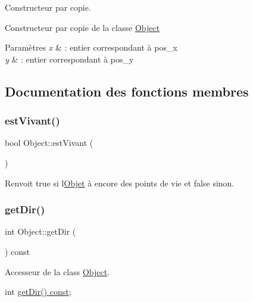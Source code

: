 Constructeur par copie. 

Constructeur par copie de la classe \hyperlink{class_object}{Object}


\begin{DoxyParams}{Paramètres}
{\em x} & \+: entier correspondant à pos\+\_\+x \\
\hline
{\em y} & \+: entier correspondant à pos\+\_\+y \\
\hline
\end{DoxyParams}


\subsection{Documentation des fonctions membres}
\mbox{\label{class_object_ae013d3c24ca77287536bfc594f763b60}} 
\subsubsection{\texorpdfstring{est\+Vivant()}{estVivant()}}
{\footnotesize\ttfamily bool Object\+::est\+Vivant (\begin{DoxyParamCaption}{ }\end{DoxyParamCaption})}



Renvoit true si l\textquotesingle{}\hyperlink{class_objet}{Objet} à encore des points de vie et false sinon. 

\mbox{\label{class_object_ac2053fa5af98fc92a4c990946a926aa5}} 
\subsubsection{\texorpdfstring{get\+Dir()}{getDir()}}
{\footnotesize\ttfamily int Object\+::get\+Dir (\begin{DoxyParamCaption}{ }\end{DoxyParamCaption}) const}



Accesseur de la class \hyperlink{class_object}{Object}. 

int \hyperlink{class_object_ac2053fa5af98fc92a4c990946a926aa5}{get\+Dir() const}; \mbox{\label{class_object_ad7dcd5f1f45ce373c6e57bae5d1aebec}} 
